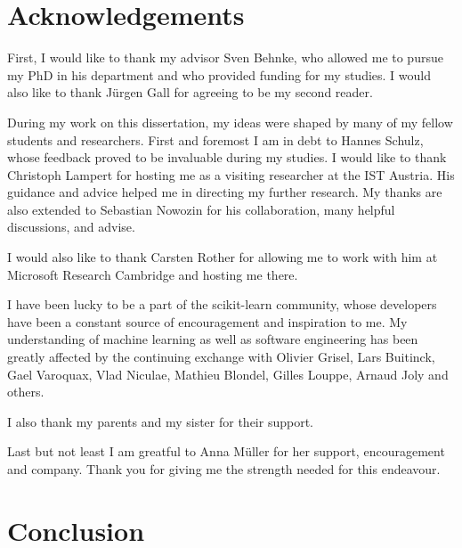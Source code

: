 \documentclass[12pt,toc=bibnumbered, a4paper,twoside,DIV=11]{scrbook}
\begin{document}
\chapter*{Acknowledgements}
First, I would like to thank my advisor Sven Behnke, who allowed me
to pursue my PhD in his department and who provided funding for my studies.
I would also like to thank J\"urgen Gall for agreeing to be my second reader.

During my work on this dissertation, my ideas were shaped by many of my fellow
students and researchers. First and foremost I am in debt to Hannes Schulz,
whose feedback proved to be invaluable during my studies.
I would like to thank Christoph Lampert for hosting me as a visiting researcher
at the IST Austria. His guidance and advice helped me in directing my further
research. My thanks are also extended to Sebastian Nowozin for his collaboration,
many helpful discussions, and advise.

I would also like to thank Carsten Rother for allowing me to work with him
at Microsoft Research Cambridge and hosting me there.

I have been lucky to be a part of the scikit-learn community, whose developers
have been a constant source of encouragement and inspiration to me. My
understanding of machine learning as well as software engineering has been
greatly affected by the continuing exchange with Olivier Grisel, Lars Buitinck,
Gael Varoquax, Vlad Niculae, Mathieu Blondel, Gilles Louppe, Arnaud Joly and
others.

I also thank my parents and my sister for their support.

Last but not least I am greatful to Anna M\"uller for her support,
encouragement and company. Thank you for giving me the strength needed for this
endeavour.



%













\chapter{Conclusion}



\end{document}
